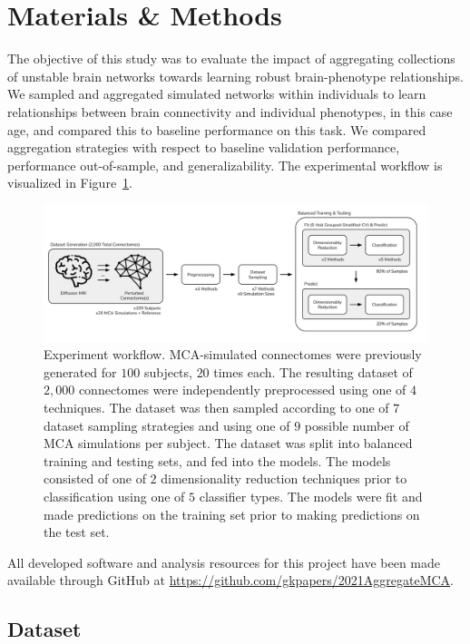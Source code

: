 \documentclass[10pt]{SelfArx} %
\begin{document}
\section*{Materials \& Methods}

The objective of this study was to evaluate the impact of aggregating collections of unstable brain networks towards
learning robust brain-phenotype relationships. We sampled and aggregated simulated networks within individuals to learn
relationships between brain connectivity and individual phenotypes, in this case age, and compared this to baseline
performance on this task. We compared aggregation strategies with respect to baseline validation performance,
performance out-of-sample, and generalizability. The experimental workflow is visualized in Figure~\ref{fig:workflow}.

\begin{figure}[bth!]\centering
\includegraphics[width=\linewidth]{figures/0.pdf}
\caption{Experiment workflow. MCA-simulated connectomes were previously generated for $100$ subjects, $20$ times each.
The resulting dataset of $2,000$ connectomes were independently preprocessed using one of $4$ techniques. The dataset
was then sampled according to one of $7$ dataset sampling strategies and using one of $9$ possible number of MCA
simulations per subject. The dataset was split into balanced training and testing sets, and fed into the models. The
models consisted of one of $2$ dimensionality reduction techniques prior to classification using one of $5$ classifier
types. The models were fit and made predictions on the training set prior to making predictions on the test set.}
\label{fig:workflow}
\end{figure}

All developed software and analysis resources for this project have been made available through GitHub at
\url{https://github.com/gkpapers/2021AggregateMCA}.

\subsection*{Dataset}
\end{document}
